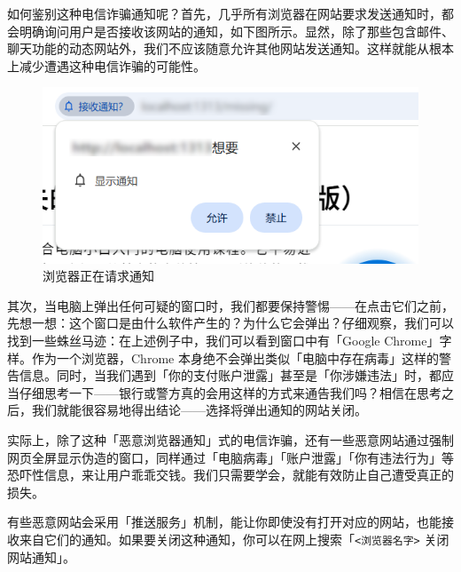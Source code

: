如何鉴别这种电信诈骗通知呢？首先，几乎所有浏览器在网站要求发送通知时，都会明确询问用户是否接收该网站的通知，如下图所示。显然，除了那些包含邮件、聊天功能的动态网站外，我们不应该随意允许其他网站发送通知。这样就能从根本上减少遭遇这种电信诈骗的可能性。

\begin{figure}[htb!]
  \centering
  \includegraphics[width=.6\textwidth]{assets/basic/Website_ask_for_notification_permission.png}
  \caption{浏览器正在请求通知}
  \label{fig:Website_ask_for_notification_permission}
\end{figure}

其次，当电脑上弹出任何可疑的窗口时，我们都要保持警惕——在点击它们之前，先想一想：这个窗口是由什么软件产生的？为什么它会弹出？仔细观察，我们可以找到一些蛛丝马迹：在上述例子中，我们可以看到窗口中有「Google Chrome」字样。作为一个浏览器，Chrome 本身绝不会弹出类似「电脑中存在病毒」这样的警告信息。同时，当我们遇到「你的支付账户泄露」甚至是「你涉嫌违法」时，都应当仔细思考一下——银行或警方真的会用这样的方式来通告我们吗？相信在思考之后，我们就能很容易地得出结论——选择将弹出通知的网站关闭。

实际上，除了这种「恶意浏览器通知」式的电信诈骗，还有一些恶意网站通过强制网页全屏显示伪造的窗口，同样通过「电脑病毒」「账户泄露」「你有违法行为」等恐吓性信息，来让用户乖乖交钱。我们只需要学会，就能有效防止自己遭受真正的损失。

\begin{note}
  有些恶意网站会采用「推送服务」机制，能让你即使没有打开对应的网站，也能接收来自它们的通知。如果要关闭这种通知，你可以在网上搜索「\texttt{<浏览器名字>} 关闭网站通知」。
\end{note}

\practice


